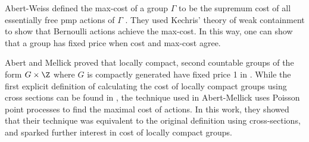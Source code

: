 \documentclass[12pt]{article}
\theoremstyle{plain}
\newtheorem{thm}{Theorem}[section]
\theoremstyle{definition}
\theoremstyle{remark}
\newcommand{\G}{\Gamma}
\newcommand\Pois{\operatorname{Pois}}
\def\cc{{\curvearrowright}}
\begin{document}
Abert-Weiss defined the max-cost of a group $\G$ to be the supremum cost of all essentially free pmp actions of $\G$ \cite{abert-weiss-2013}.  They used Kechris' theory of weak containment to show that Bernoulli actions achieve the max-cost. In this way, one can show that a group has fixed price when cost and max-cost agree. %











Abert and Mellick proved that locally compact, second countable groups of the form $G\times \Z$ where $G$ is compactly generated have fixed price 1 in \cite{MR4555892}. While the first explicit definition of calculating the cost of locally compact groups using cross sections can be found in \cite{MR4538560}, the technique used in Abert-Mellick uses Poisson point processes to find the maximal cost of actions. In this work, they showed that their technique was equivalent to the original definition using cross-sections, and sparked further interest in cost of locally compact groups.
\end{document}
